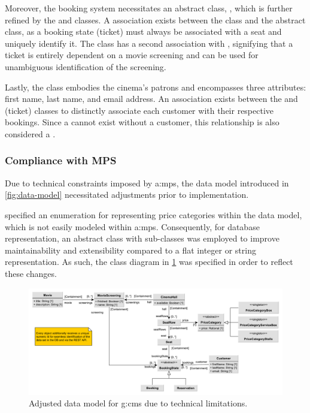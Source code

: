 Moreover, the booking system necessitates an abstract class, , which is further refined by the  and  classes. A \containment association exists between the  class and the abstract  class, as a booking state (ticket) must always be associated with a seat and uniquely identify it. The  class has a second \containment association with , signifying that a ticket is entirely dependent on a movie screening and can be used for unambiguous identification of the screening.

Lastly, the  class embodies the cinema's patrons and encompasses three attributes: first name, last name, and email address. An association exists between the  and  (ticket) classes to distinctly associate each customer with their respective bookings. Since a  cannot exist without a customer, this relationship is also considered a \containment.

\subsubsection{Compliance with MPS}\label{sec:cs-data-mps}

Due to technical constraints imposed by \gls{a:mps}, the data model introduced in \cref{fig:data-model} necessitated adjustments prior to implementation.

 specified an enumeration for representing price categories within the data model, which is not easily modeled within \gls{a:mps}. Consequently, for database representation, an abstract class with sub-classes was employed to improve maintainability and extensibility compared to a flat integer or string representation. As such, the class diagram in \cref{fig:data-model-mps} was specified in order to reflect these changes.

\begin{figure}[H]
    \centering
    \includegraphics[width=\textwidth]{images/data-model-final-with-price}
    \caption{Adjusted data model for \gls{g:cms} due to technical limitations.}
    \label{fig:data-model-mps}
\end{figure}

